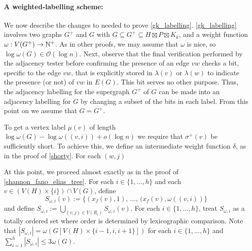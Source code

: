\documentclass{patmorin}
\renewcommand{\le}{\leqslant}
\newcommand{\Oh}{\calO}
\newcommand{\calO}{\mathcal{O}}
\begin{document}
  \paragraph{A weighted-labelling scheme:}
  We now describe the changes to \cite{gawrychowski.janczewski:simpler,dujmovic.esperet.ea:adjacency} needed to prove \cref{gk_labelling}.
  \cref{gk_labelling} involves two graphs $G^+$ and $G$ with $G\subseteq G^+\subseteq H\boxtimes P\boxtimes K_k$, and a weight function $\omega:V(G^+)\to\mathbb{N}^+$.  As in other proofs, we may assume that $\omega$ is nice, so $\log\omega(G)\in\Oh(\log n)$.
  Next, observe that the final verification performed by the adjacency tester before confirming the presence of an edge $vw$ checks a bit, specific to the edge $vw$, that is explicitly stored in $\lambda(v)$ or $\lambda(w)$ to indicate the presence (or not) of $vw$ in $E(G)$.
  This bit serves no other purpose.  Thus, the adjacency labelling for the supergraph $G^+$ of $G$ can be made into an adjacency labelling for $G$ by changing a subset of the bits in each label.
  From this point on we assume that $G=G^+$.

  To get a vertex label $\mu(v)$ of length $\log \omega(G)-\log\omega((v,i)) + o(\log n)$ we require that $\sigma^+(v)$ be sufficiently short.  To achieve this, we define an intermediate weight function $\delta$, as in the proof of \cref{shorty}.  For each $(w,j)$
  
  At this point, we proceed almost exactly as in the proof of \cref{shannon_fano_elias_tree}.
  For each $i\in\{1,\ldots,h\}$ and each $v\in (V(H)\times\{i\})\cap V(G)$, define
  \[
     S_{\omega,i}(v):=\{(x_f(v),1),\,\ldots,\, (x_f(v),\omega((v,i))\}
  \]
  and define $S_{\omega,i}:=\bigcup_{(v,j)\in V(R_i)}S_{\omega,i}(v)$.  For each $i\in\{1,\ldots,h\}$, treat $S_{\omega,i}$ as a totally ordered set where order is determined by lexicographic comparison.  Note that $|S_{\omega,i}|=\omega(G[V(H)\times\{i-1,i,i+1\}])$ for each $i\in\{1,\ldots,h\}$ and $\sum_{i=1}^h |S_{\omega,i}|\le 3\omega(G)$.
\end{document}
